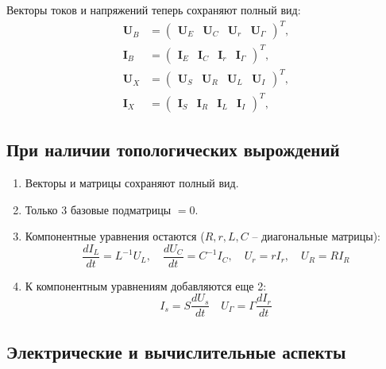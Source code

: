	Векторы токов и напряжений теперь сохраняют полный вид:
	\begin{equation}
		\begin{aligned}
			\bm{U}_B &= \begin{pmatrix} \bm{U}_E & \bm{U}_C & \bm{U}_r & \bm{U}_\Gamma \end{pmatrix}^T, \\
			\bm{I}_B &= \begin{pmatrix} \bm{I}_E & \bm{I}_C & \bm{I}_r & \bm{I}_\Gamma \end{pmatrix}^T, \\
			\bm{U}_X &= \begin{pmatrix} \bm{U}_S & \bm{U}_R & \bm{U}_L & \bm{U}_I \end{pmatrix}^T, \\
			\bm{I}_X &= \begin{pmatrix} \bm{I}_S & \bm{I}_R & \bm{I}_L & \bm{I}_I \end{pmatrix}^T,
		\end{aligned}
	\end{equation}
	
	
	\subsection{При наличии топологичесĸих вырождений}
	
	\begin{enumerate}
		\item Векторы и матрицы сохраняют полный вид.
		\item Только 3 базовые подматрицы $=0$.
	
		\item Компонентные уравнения остаются ($R, r, L, C$ – диагональные матрицы):
		\begin{equation}
			\frac{d I_L}{dt} = L^{-1} U_L, \quad \frac{d U_C}{dt} = C^{-1} I_C, \quad U_r = r I_r, \quad U_R = R I_R
		\end{equation}
		\item К компонентным уравнениям добавляются еще 2:
		\begin{equation}
			I_s = S \frac{d U_s}{dt} \quad U_\Gamma = \Gamma \frac{d I_r}{dt}
		\end{equation}
	\end{enumerate}
	
	\subsection{Электрические и вычислительные аспекты}
	
